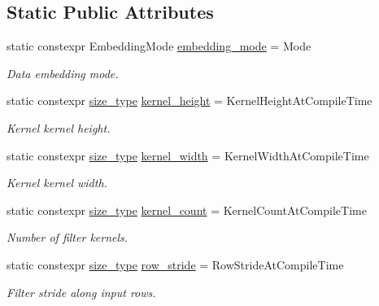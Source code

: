 \subsection*{Static Public Attributes}
\begin{DoxyCompactItemize}
\item 
static constexpr Embedding\-Mode \hyperlink{structffnn_1_1layer_1_1convolution__layer__options_a7f7a41732d32af9009d9c6185a4eef5a}{embedding\-\_\-mode} = Mode
\begin{DoxyCompactList}\small\item\em Data embedding mode. \end{DoxyCompactList}\item 
static constexpr \hyperlink{namespaceffnn_a63b90a2fd70eb76684eac482a51633e5}{size\-\_\-type} \hyperlink{structffnn_1_1layer_1_1convolution__layer__options_adfab0e8e8f7e9537dc60a0e56e311161}{kernel\-\_\-height} = Kernel\-Height\-At\-Compile\-Time
\begin{DoxyCompactList}\small\item\em Kernel kernel height. \end{DoxyCompactList}\item 
static constexpr \hyperlink{namespaceffnn_a63b90a2fd70eb76684eac482a51633e5}{size\-\_\-type} \hyperlink{structffnn_1_1layer_1_1convolution__layer__options_a117ca045ad1ab24a5b80935c332d5001}{kernel\-\_\-width} = Kernel\-Width\-At\-Compile\-Time
\begin{DoxyCompactList}\small\item\em Kernel kernel width. \end{DoxyCompactList}\item 
static constexpr \hyperlink{namespaceffnn_a63b90a2fd70eb76684eac482a51633e5}{size\-\_\-type} \hyperlink{structffnn_1_1layer_1_1convolution__layer__options_a666df8b2074fb8e749f4a8ecd7d89957}{kernel\-\_\-count} = Kernel\-Count\-At\-Compile\-Time
\begin{DoxyCompactList}\small\item\em Number of filter kernels. \end{DoxyCompactList}\item 
static constexpr \hyperlink{namespaceffnn_a63b90a2fd70eb76684eac482a51633e5}{size\-\_\-type} \hyperlink{structffnn_1_1layer_1_1convolution__layer__options_a6a12ff75eaa8b67b66396b90804e8187}{row\-\_\-stride} = Row\-Stride\-At\-Compile\-Time
\begin{DoxyCompactList}\small\item\em Filter stride along input rows. \end{DoxyCompactList}\item 

\end{DoxyCompactItemize}

